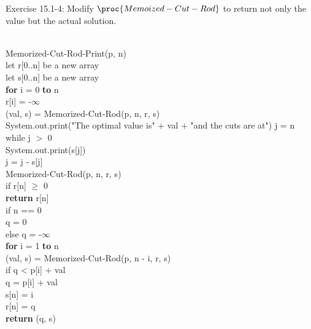\documentclass[addpoints,11pt]{exam}
\begin{document}
\begin{questions}
%
%
\question[5]
Exercise 15.1-4:  Modify $\proc{Memoized-Cut-Rod}$ to return not only the value but the actual solution.
\begin{solutionorbox}\\	
	Memorized-Cut-Rod-Print(p, n)\\
	let r[0..n] be a new array\\
	let s[0..n] be a new array\\
	\textbf{for} i = 0 \textbf{to} n\\
	\hspace*{5mm}r[i] = -$\infty$\\
	(val, s) = Memorized-Cut-Rod(p, n, r, s)\\
	System.out.print("The optimal value is" + val + "and the cuts are at")
	j = n\\
	while j $>$ 0\\
	\hspace*{5mm}System.out.print(s[j])\\
	\hspace*{5mm}j = j - s[j]\\
	
	Memorized-Cut-Rod(p, n, r, s)\\
	if r[n] $\geq$ 0\\
	\hspace*{5mm}\textbf{return} r[n]\\
	if n == 0\\
	\hspace*{5mm}q = 0\\
	else q = -$\infty$\\
	\hspace*{5mm}\textbf{for} i = 1 \textbf{to} n\\
	\hspace*{5mm} \hspace*{5mm} (val, s) = Memorized-Cut-Rod(p, n - i, r, s)\\
	\hspace*{5mm} \hspace*{5mm} if q < p[i] + val\\
	\hspace*{5mm} \hspace*{5mm} \hspace*{5mm} q = p[i] + val\\
	\hspace*{5mm} \hspace*{5mm} \hspace*{5mm} s[n] = i\\
	r[n] = q\\
	\textbf{return} (q, s)\\
\end{solutionorbox}


\end{questions}
\end{document}
